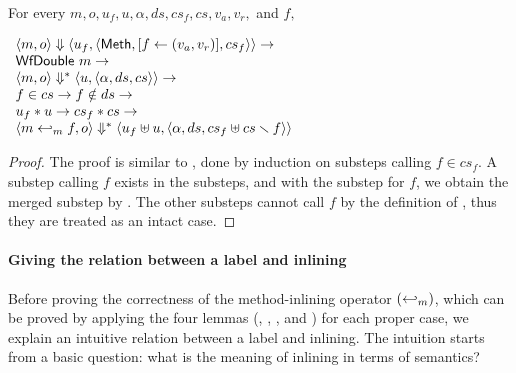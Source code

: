\begin{lemma}
  \label{lem-inlinedmm-meth2}
  \mbox{}\\
  For every $m, o, u_f, u, \alpha, ds, cs_f, cs, v_a, v_r,$ and $f,$
  \begin{center}
    \begin{math}
      \begin{array}{l}
        \langle m, o \rangle \Downarrow \langle u_f, \langle \textsf{Meth},  [ f \leftarrow (v_a, v_r) ], cs_f \rangle \rangle \to \\
        \textsf{WfDouble}\ m \to \\
        \langle m, o \rangle \Downarrow^{\ast} \langle u, \langle \alpha, ds, cs \rangle \rangle \to \\
        f \in cs \to f \notin ds \to \\
        u_f \ast u \to cs_f \ast cs \to \\
        \langle m \hookleftarrow_{m}{} f, o \rangle \Downarrow^{\ast} \langle u_f \uplus u, \langle \alpha, ds, cs_f \uplus cs \smallsetminus{} f \rangle \rangle
      \end{array}
    \end{math}
  \end{center}
\end{lemma}
\begin{proof}
  The proof is similar to , done by
  induction on substeps calling $f \in cs_f$. A substep calling $f$
  exists in the substeps, and with the substep for $f$, we obtain the
  merged substep by . The other
  substeps cannot call $f$ by the definition of \Substeps{}, thus they
  are treated as an intact case.
\end{proof}

\paragraph{Giving the relation between a label and inlining}

Before proving the correctness of the method-inlining operator
$(\hookleftarrow_{m})$, which can be proved by applying the four lemmas
(, ,
, and ) for
each proper case, we explain an intuitive relation between a label and
inlining. The intuition starts from a basic question: what is the
meaning of inlining in terms of semantics?

